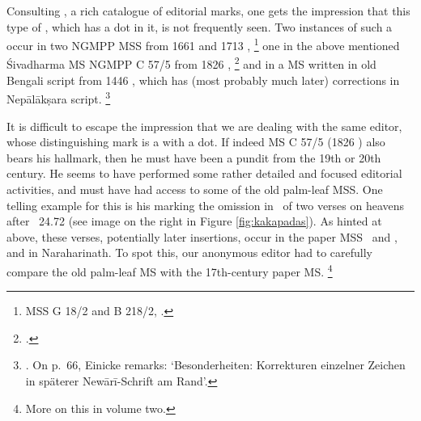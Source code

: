 Consulting , 
a rich catalogue of editorial marks,
one gets the impression that this type 
of , which has a dot in it,
is not frequently seen. Two instances of such a 
  occur in two NGMPP 
  MSS from 1661 and 1713 \CE,%
 		\footnote{MSS G 18/2 and B 218/2, 
 							.}
one in the above mentioned Śivadharma MS 
NGMPP C 57/5 from 1826 \CE,%
		\footnote{.} 
 and in a  MS written 
 in old Bengali script from 1446 \CE, 
 which has (most probably much later) corrections
 in Nepālākṣara script.%
 					 \footnote{.
 					 On p.~66, Einicke remarks: `Besonderheiten: 
 					 Korrekturen einzelner Zeichen in späterer 
 					 Newārī-Schrift am Rand'.}
 				 
It is difficult to escape the impression that
we are dealing with the same editor, whose
distinguishing mark is a  
with a dot. If indeed MS C 57/5 (1826 \CE) also bears
his hallmark, then he must have been a pundit from 
the 19th or 20th century. He seems to have performed
some rather detailed and focused editorial activities, and
must have had access to some of the old palm-leaf MSS.
One telling example for this is his marking the omission
in \msNa\ of two  verses on heavens after
\VSS\ 24.72 (see image on the right in Figure
\ref{fig:kakapadas}). 
As hinted at above, these verses, 
potentially later insertions, occur in the paper MSS
 \msPaperA\ and \msPaperC, and in Naraharinath.
To spot this, our anonymous editor had to
carefully compare the old palm-leaf MS with the 
17th-century paper MS.%
		\footnote{More on this in volume two.}
 				 

